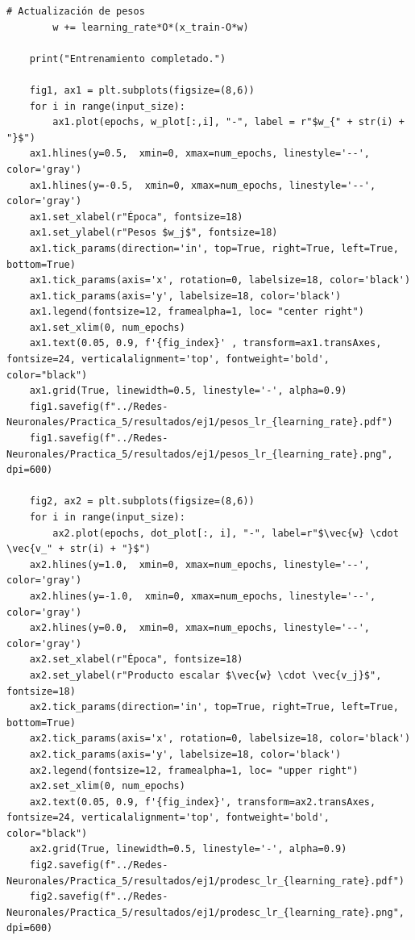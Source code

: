 \documentclass[11pt,twocolumn,twoside]{opticajnl}
\begin{document}
\begin{onecolumn}
\begin{lstlisting}[style=mystyle]
        # Actualización de pesos
        w += learning_rate*O*(x_train-O*w)
    
    print("Entrenamiento completado.")
    
    fig1, ax1 = plt.subplots(figsize=(8,6))
    for i in range(input_size):
        ax1.plot(epochs, w_plot[:,i], "-", label = r"$w_{" + str(i) + "}$")
    ax1.hlines(y=0.5,  xmin=0, xmax=num_epochs, linestyle='--', color='gray')
    ax1.hlines(y=-0.5,  xmin=0, xmax=num_epochs, linestyle='--', color='gray')
    ax1.set_xlabel(r"Época", fontsize=18)
    ax1.set_ylabel(r"Pesos $w_j$", fontsize=18)
    ax1.tick_params(direction='in', top=True, right=True, left=True, bottom=True)
    ax1.tick_params(axis='x', rotation=0, labelsize=18, color='black')
    ax1.tick_params(axis='y', labelsize=18, color='black')
    ax1.legend(fontsize=12, framealpha=1, loc= "center right")
    ax1.set_xlim(0, num_epochs)
    ax1.text(0.05, 0.9, f'{fig_index}' , transform=ax1.transAxes, fontsize=24, verticalalignment='top', fontweight='bold', color="black")
    ax1.grid(True, linewidth=0.5, linestyle='-', alpha=0.9)
    fig1.savefig(f"../Redes-Neuronales/Practica_5/resultados/ej1/pesos_lr_{learning_rate}.pdf")
    fig1.savefig(f"../Redes-Neuronales/Practica_5/resultados/ej1/pesos_lr_{learning_rate}.png", dpi=600)
    
    fig2, ax2 = plt.subplots(figsize=(8,6))
    for i in range(input_size):
        ax2.plot(epochs, dot_plot[:, i], "-", label=r"$\vec{w} \cdot \vec{v_" + str(i) + "}$")
    ax2.hlines(y=1.0,  xmin=0, xmax=num_epochs, linestyle='--', color='gray')
    ax2.hlines(y=-1.0,  xmin=0, xmax=num_epochs, linestyle='--', color='gray')
    ax2.hlines(y=0.0,  xmin=0, xmax=num_epochs, linestyle='--', color='gray')
    ax2.set_xlabel(r"Época", fontsize=18)
    ax2.set_ylabel(r"Producto escalar $\vec{w} \cdot \vec{v_j}$", fontsize=18)
    ax2.tick_params(direction='in', top=True, right=True, left=True, bottom=True)
    ax2.tick_params(axis='x', rotation=0, labelsize=18, color='black')
    ax2.tick_params(axis='y', labelsize=18, color='black')
    ax2.legend(fontsize=12, framealpha=1, loc= "upper right")
    ax2.set_xlim(0, num_epochs)
    ax2.text(0.05, 0.9, f'{fig_index}', transform=ax2.transAxes, fontsize=24, verticalalignment='top', fontweight='bold', color="black")
    ax2.grid(True, linewidth=0.5, linestyle='-', alpha=0.9)
    fig2.savefig(f"../Redes-Neuronales/Practica_5/resultados/ej1/prodesc_lr_{learning_rate}.pdf")
    fig2.savefig(f"../Redes-Neuronales/Practica_5/resultados/ej1/prodesc_lr_{learning_rate}.png", dpi=600)



\end{lstlisting}
\end{onecolumn}
\end{document}
